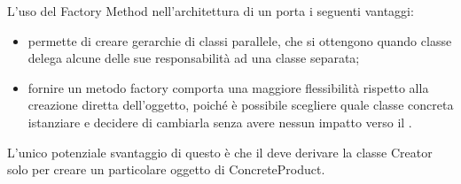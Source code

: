 		L'uso del  Factory Method nell'architettura di un   porta i seguenti vantaggi:
		\begin{itemize}
			\item permette di creare gerarchie di classi parallele, che si ottengono quando classe delega alcune delle sue responsabilità ad una classe separata;
			\item fornire un metodo factory comporta una maggiore flessibilità rispetto alla creazione diretta dell'oggetto, poiché è possibile scegliere quale classe concreta istanziare e decidere di cambiarla senza avere nessun impatto verso il .
		\end{itemize}
		L'unico potenziale svantaggio di questo  è che il  deve derivare la classe Creator solo per creare un particolare oggetto di ConcreteProduct.